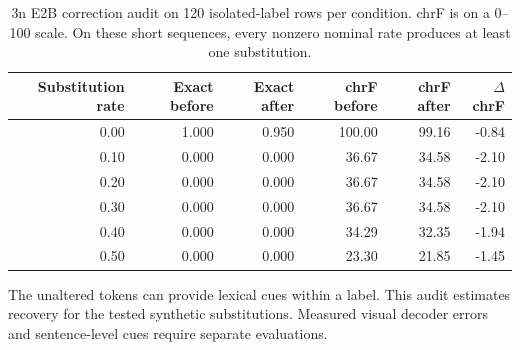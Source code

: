 \begin{table}[t]
\centering\small
\caption{\Gemma{} 3n E2B correction audit on 120 isolated-label rows per
condition.  chrF is on a 0--100 scale.  On these short sequences, every nonzero
nominal rate produces at least one substitution.}
\label{tab:gemma-tolerance}
\begin{tabular}{rrrrrr}
\toprule
Substitution rate & Exact before & Exact after & chrF before & chrF after & $\Delta$chrF \\
\midrule
0.00 & 1.000 & 0.950 & 100.00 & 99.16 & -0.84 \\
0.10 & 0.000 & 0.000 & 36.67 & 34.58 & -2.10 \\
0.20 & 0.000 & 0.000 & 36.67 & 34.58 & -2.10 \\
0.30 & 0.000 & 0.000 & 36.67 & 34.58 & -2.10 \\
0.40 & 0.000 & 0.000 & 34.29 & 32.35 & -1.94 \\
0.50 & 0.000 & 0.000 & 23.30 & 21.85 & -1.45 \\
\bottomrule
\end{tabular}
\end{table}

The unaltered tokens can provide lexical cues within a label.  This audit
estimates recovery for the tested synthetic substitutions.  Measured visual
decoder errors and sentence-level cues require separate evaluations.
